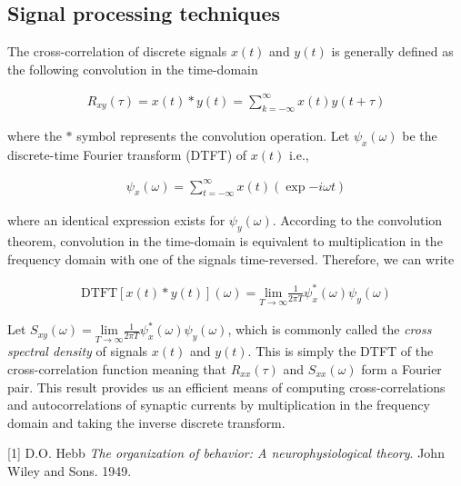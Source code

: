 \documentclass{ucetd}
\begin{document}
\subsection{Signal processing techniques}

The cross-correlation of discrete signals $x(t)$ and $y(t)$ is generally defined as the following convolution in the time-domain

\begin{align}
R_{xy}(\tau) = x(t) * y(t) = \sum_{k =-\infty}^{\infty}x(t)y(t+\tau)
\end{align}

where the $*$ symbol represents the convolution operation. Let $\psi_{x}(\omega)$ be the discrete-time Fourier transform (DTFT) of $x(t)$ i.e.,

\begin{align}
\psi_{x}(\omega) = \sum_{t =-\infty}^{\infty}x(t)\left(\exp{-i\omega t}\right)
\end{align}

where an identical expression exists for $\psi_{y}(\omega)$. According to the convolution theorem, convolution in the time-domain is equivalent to multiplication in the frequency domain with one of the signals time-reversed. Therefore, we can write

\begin{align}
\mathrm{DTFT}[x(t) * y(t)](\omega) = \underset{T\rightarrow\infty}{\mathrm{lim}}\frac{1}{2\pi T}\psi_{x}^{*}(\omega)\psi_{y}(\omega)
\end{align}


Let $S_{xy}(\omega) = \underset{T\rightarrow\infty}{\mathrm{lim}}\frac{1}{2\pi T}\psi_{x}^{*}(\omega)\psi_{y}(\omega)$, which is commonly called the \emph{cross spectral density} of signals $x(t)$ and $y(t)$. This is simply the DTFT of the cross-correlation function meaning that $R_{xx}(\tau)$ and $S_{xx}(\omega)$ form a Fourier pair. This result provides us an efficient means of computing cross-correlations and autocorrelations of synaptic currents by multiplication in the frequency domain and taking the inverse discrete transform.

\begin{appendices}
\end{appendices}

\makebibliography

[1] D.O. Hebb \textit{The organization of behavior: A neurophysiological theory}. John Wiley and Sons. 1949.

%
%
\end{document}
